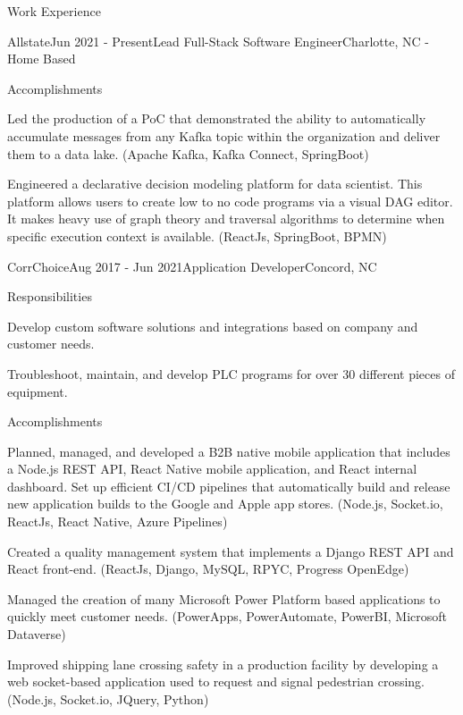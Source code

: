 \documentclass{resume}
\begin{document}
\begin{basicSection}{Work Experience}
\begin{workExperienceSection}{Allstate}{Jun 2021 - Present}{Lead Full-Stack Software Engineer}{Charlotte, NC - Home Based}
\begin{workExperienceSectionSubSection}{Accomplishments}
                \item Led the production of a PoC that demonstrated the ability to automatically accumulate messages from any Kafka topic within the organization and deliver them to a data lake. (Apache Kafka, Kafka Connect, SpringBoot)
                \item Engineered a declarative decision modeling platform for data scientist.
                This platform allows users to create low to no code programs via a visual DAG editor.
                It makes heavy use of graph theory and traversal algorithms to determine when specific execution context is available. (ReactJs, SpringBoot, BPMN)
            \end{workExperienceSectionSubSection}
        \end{workExperienceSection}
        \begin{workExperienceSection}{CorrChoice}{Aug 2017 - Jun 2021}{Application Developer}{Concord, NC}
            \begin{workExperienceSectionSubSection}{Responsibilities}
                \item Develop custom software solutions and integrations based on company and customer needs.
                \item Troubleshoot, maintain, and develop PLC programs for over 30 different pieces of equipment.
            \end{workExperienceSectionSubSection}
            \begin{workExperienceSectionSubSection}{Accomplishments}
                \item Planned, managed, and developed a B2B native mobile application that includes a Node.js REST API, React Native mobile application, and React internal dashboard.
                Set up efficient CI/CD pipelines that automatically build and release new application builds to the Google and Apple app stores. (Node.js, Socket.io, ReactJs, React Native, Azure Pipelines)
                \item Created a quality management system that implements a Django REST API and React front-end. (ReactJs, Django, MySQL, RPYC, Progress OpenEdge)
                \item Managed the creation of many Microsoft Power Platform based applications to quickly meet customer needs. (PowerApps, PowerAutomate, PowerBI, Microsoft Dataverse)
                \item Improved shipping lane crossing safety in a production facility by developing a web socket-based application used to request and signal pedestrian crossing. (Node.js, Socket.io, JQuery, Python)

\end{workExperienceSectionSubSection}
\end{workExperienceSection}
\end{basicSection}
\end{document}
